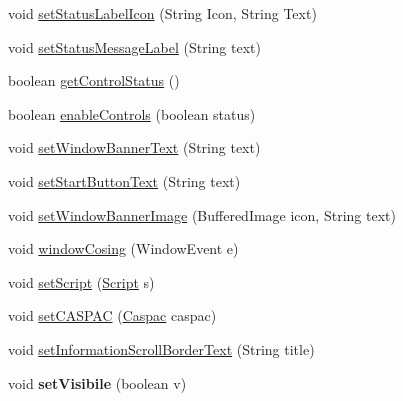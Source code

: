 \begin{DoxyCompactItemize}
\item 
void \hyperlink{classGUI_1_1development_1_1CASUALJFrameMain_a6abde49bfe2650f447b5c6abc7d6f077}{set\-Status\-Label\-Icon} (String Icon, String Text)
\item 
void \hyperlink{classGUI_1_1development_1_1CASUALJFrameMain_ad655b0e480491023e7ad25af422c95a9}{set\-Status\-Message\-Label} (String text)
\item 
boolean \hyperlink{classGUI_1_1development_1_1CASUALJFrameMain_af0f386b4ecdf89d6eaa43dc78cd4f6ef}{get\-Control\-Status} ()
\item 
boolean \hyperlink{classGUI_1_1development_1_1CASUALJFrameMain_ae8a8f3e56ff374c6274633ed621dc815}{enable\-Controls} (boolean status)
\item 
void \hyperlink{classGUI_1_1development_1_1CASUALJFrameMain_ab21ac8cd692ec2a63ae0339bb68e374e}{set\-Window\-Banner\-Text} (String text)
\item 
void \hyperlink{classGUI_1_1development_1_1CASUALJFrameMain_a9e5b6e12ea7e3967c9f628788e3bc860}{set\-Start\-Button\-Text} (String text)
\item 
void \hyperlink{classGUI_1_1development_1_1CASUALJFrameMain_a61c6f0a35b429a38f63317e05afaf921}{set\-Window\-Banner\-Image} (Buffered\-Image icon, String text)
\item 
void \hyperlink{classGUI_1_1development_1_1CASUALJFrameMain_ad2838f5ac8ff377c58a8423f3eae1be6}{window\-Cosing} (Window\-Event e)
\item 
void \hyperlink{classGUI_1_1development_1_1CASUALJFrameMain_a5c63c8abc79e383d5ebf1d38c4dfcd13}{set\-Script} (\hyperlink{classCASUAL_1_1caspac_1_1Script}{Script} s)
\item 
void \hyperlink{classGUI_1_1development_1_1CASUALJFrameMain_ae49b006965b1e155a86c6c8c7aec1ecb}{set\-C\-A\-S\-P\-A\-C} (\hyperlink{classCASUAL_1_1caspac_1_1Caspac}{Caspac} caspac)
\item 
void \hyperlink{classGUI_1_1development_1_1CASUALJFrameMain_aa715222603235cd4c0e10ccf8ec35c64}{set\-Information\-Scroll\-Border\-Text} (String title)
\item 
\hypertarget{classGUI_1_1development_1_1CASUALJFrameMain_a96d8372cafb7676437d70cd9e8167f7e}{void {\bfseries set\-Visibile} (boolean v)}\label{classGUI_1_1development_1_1CASUALJFrameMain_a96d8372cafb7676437d70cd9e8167f7e}


\end{DoxyCompactItemize}

